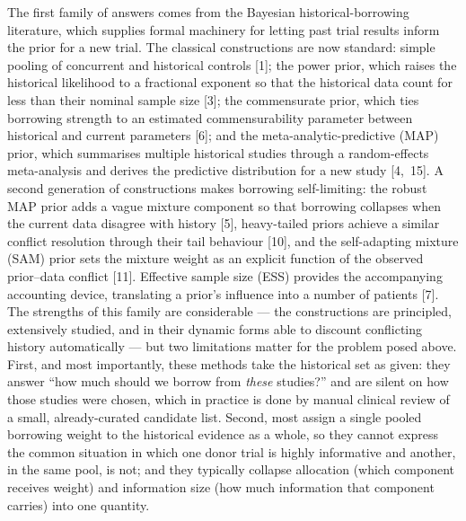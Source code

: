 \documentclass[11pt]{article}
\begin{document}
The first family of answers comes from the Bayesian historical-borrowing
literature, which supplies formal machinery for letting past trial results
inform the prior for a new trial. The classical constructions are now
standard: simple pooling of concurrent and historical controls [1]; the power
prior, which raises the historical likelihood to a fractional exponent so that
the historical data count for less than their nominal sample size [3]; the
commensurate prior, which ties borrowing strength to an estimated
commensurability parameter between historical and current parameters [6]; and
the meta-analytic-predictive (MAP) prior, which summarises multiple historical
studies through a random-effects meta-analysis and derives the predictive
distribution for a new study [4,~15]. A second generation of constructions makes
borrowing self-limiting: the robust MAP prior adds a vague mixture component so
that borrowing collapses when the current data disagree with history [5],
heavy-tailed priors achieve a similar conflict resolution through their tail
behaviour [10], and the self-adapting mixture (SAM) prior sets the mixture
weight as an explicit function of the observed prior--data conflict [11].
Effective sample size (ESS) provides the accompanying accounting device,
translating a prior's influence into a number of patients [7]. The strengths of
this family are considerable --- the constructions are principled, extensively
studied, and in their dynamic forms able to discount conflicting history
automatically --- but two limitations matter for the problem posed above. First,
and most importantly, these methods take the historical set as given: they
answer ``how much should we borrow from \emph{these} studies?'' and are silent on
how those studies were chosen, which in practice is done by manual clinical
review of a small, already-curated candidate list. Second, most assign a single
pooled borrowing weight to the historical evidence as a whole, so they cannot
express the common situation in which one donor trial is highly informative and
another, in the same pool, is not; and they typically collapse allocation (which
component receives weight) and information size (how much information that
component carries) into one quantity.
\end{document}
